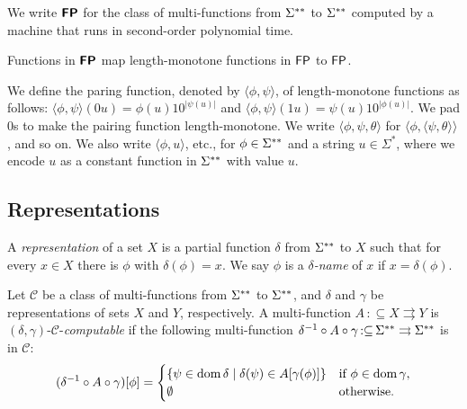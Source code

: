 \documentclass[envcountsame,orivec,oribibl]{llncs}
\newcommand{\pcolon}{\mathpunct{\,:\subseteq}}
\begin{document}
\begin{definition}
 We write $\text{\bfseries \sffamily \upshape FP}$ for the class of
 multi-functions from $\Sigma ^{**}$ to $\Sigma ^{**}$ 
 computed by a machine that runs
 in second-order polynomial time.
\end{definition}

\begin{lemma}
 Functions in $\text{\bfseries \sffamily \upshape FP}$ map 
 length-monotone functions in $\mathsf{FP}$ to $\mathsf{FP}$.
\end{lemma}

We define the paring function, denoted by $\langle \phi, \psi \rangle$,
of length-monotone functions as follows: 
$\langle \phi, \psi \rangle(0u) = \phi(u) 10^{|\psi(u)|}$ and 
$\langle \phi, \psi \rangle(1u) = \psi(u) 10^{|\phi(u)|}$.
We pad $0$s to make the pairing function length-monotone.
We write $\langle \phi, \psi, \theta \rangle$ 
for $\langle \phi, \langle \psi, \theta \rangle \rangle$, and so on.
We also write $\langle \phi, u \rangle$, etc., for 
$\phi \in \Sigma ^{**}$ and a string $u \in \Sigma ^*$, 
where we encode $u$ as a constant function in $\Sigma ^{**}$ with value $u$. 

\subsection{Representations}
\label{subsection: representations}

A {\em representation} of a set $X$ 
is a partial function $\delta$ from $\Sigma ^{**}$ to $X$
such that for every $x \in X$ there is $\phi$ with $\delta (\phi) = x$.
We say $\phi$ is a {\em $\delta$-name} of $x$
if $x = \delta(\phi)$.

Let $\mathcal C$ be a class of multi-functions from $\Sigma ^{**}$ to $\Sigma ^{**}$,
and $\delta$ and $\gamma$ be representations of sets $X$ and $Y$, respectively.
A multi-function $A \pcolon X \rightrightarrows Y$
is $(\delta, \gamma)$-$\mathcal C$-\emph{computable} if 
the following multi-function $\delta^{-1} \circ A \circ \gamma \pcolon \LM \rightrightarrows \LM$ is in $\mathcal C$: 
\begin{equation}
 (\delta^{-1} \circ A \circ \gamma)[\phi] = 
  \begin{cases}
   \{\psi \in \mathop{\rm dom} \delta \mid \delta(\psi) \in A[\gamma(\phi)] \}
   & 
   \text{if } \phi \in \mathop{\rm dom} \gamma, 
   \\ 
   \emptyset 
   &
   \text{otherwise.}
  \end{cases}
\end{equation}
\end{document}
